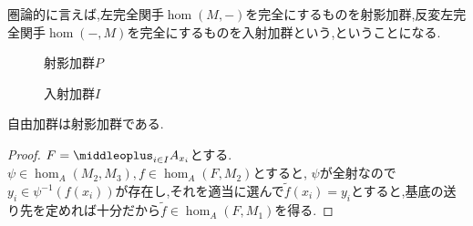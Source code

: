 圏論的に言えば,左完全関手$\hom(M,-)$を完全にするものを射影加群,反変左完全関手$\hom(-,M)$を完全にするものを入射加群という,ということになる.

\begin{minipage}{.45\hsize}
	\begin{figure}[H]
		\centering
		\caption{射影加群$P$}
	\end{figure}
\end{minipage}
\hfill
\begin{minipage}{.45\hsize}
	\begin{figure}[H]
		\centering
		\caption{入射加群$I$}
	\end{figure}
\end{minipage}

\begin{prop}\label{prop:自由加群は射影加群}
	自由加群は射影加群である.
\end{prop}
\begin{proof}
	$F=\middleoplus_{i\in I}A_{x_i}$とする. $\psi\in\hom_A(M_2,M_3),f\in\hom_A(F,M_2)$とすると, $\psi$が全射なので$y_i\in\psi^{-1}(f(x_i))$が存在し,それを適当に選んで$\widetilde{f}(x_i)=y_i$とすると,基底の送り先を定めれば十分だから$\widetilde{f}\in\hom_A(F,M_1)$を得る.
\end{proof}

